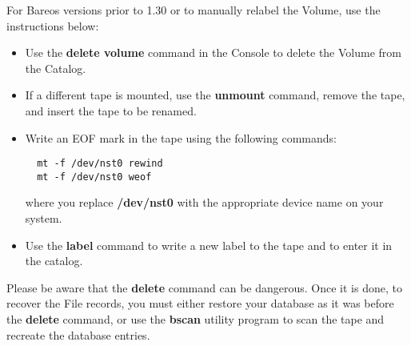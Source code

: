 For Bareos versions prior to 1.30 or to manually relabel the Volume, use the
instructions below:

\begin{itemize}
\item Use the {\bf delete volume} command in the Console  to delete the Volume
   from the Catalog.
\item If a different tape is mounted, use the {\bf unmount}  command,
   remove the tape, and insert the tape to be  renamed.
\item Write an EOF mark in the tape using the following  commands:

\footnotesize
\begin{verbatim}
  mt -f /dev/nst0 rewind
  mt -f /dev/nst0 weof
\end{verbatim}
\normalsize

where you replace {\bf /dev/nst0} with the appropriate  device name on your
system.
\item Use the {\bf label} command to write a new label to  the tape and to
   enter it in the catalog.
\end{itemize}

Please be aware that the {\bf delete} command can be dangerous. Once it is
done, to recover the File records, you must either restore your database as it
was before the {\bf delete} command, or use the {\bf bscan} utility program to
scan the tape and recreate the database entries.
